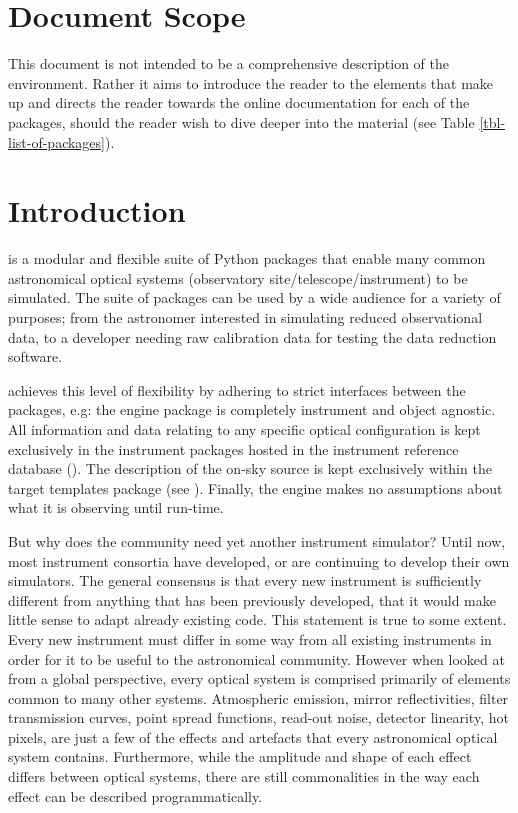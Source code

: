 \section{Document Scope}
\label{document-scope}

This document is not intended to be a comprehensive description of the \ScopeSim{} environment.
Rather it aims to introduce the reader to the elements that make up \ScopeSim{} and directs the reader towards the online documentation for each of the packages, should the reader wish to dive deeper into the material (see Table \ref{tbl-list-of-packages}).


\section{Introduction}
\label{introduction}

\ScopeSim{} is a modular and flexible suite of Python packages that enable many common astronomical optical systems (observatory site/telescope/instrument) to be simulated.
The suite of packages can be used by a wide audience for a variety of purposes; from the astronomer interested in simulating reduced observational data, to a developer needing raw calibration data for testing the data reduction software.

\ScopeSim{} achieves this level of flexibility by adhering to strict interfaces between the packages, e.g: the \ScopeSim{} engine package is completely instrument and object agnostic.
All information and data relating to any specific optical configuration is kept exclusively in the instrument packages hosted in the instrument reference database (\IRDB{}).
The description of the on-sky source is kept exclusively within the target templates package (see \ScopeSimtemplates{}).
Finally, the engine makes no assumptions about what it is observing until run-time.

But why does the community need yet another instrument simulator?
Until now, most instrument consortia have developed, or are continuing to develop their own simulators\cite{hsim, schmalzl2012, simcado2016, simcado2019}.
The general consensus is that every new instrument is sufficiently different from anything that has been previously developed, that it would make little sense to adapt already existing code.
This statement is true to some extent.
Every new instrument must differ in some way from all existing instruments in order for it to be useful to the astronomical community.
However when looked at from a global perspective, every optical system is comprised primarily of elements common to many other systems.
Atmospheric emission, mirror reflectivities, filter transmission curves, point spread functions, read-out noise, detector linearity, hot pixels, are just a few of the effects and artefacts that every astronomical optical system contains.
Furthermore, while the amplitude and shape of each effect differs between optical systems, there are still commonalities in the way each effect can be described programmatically.

